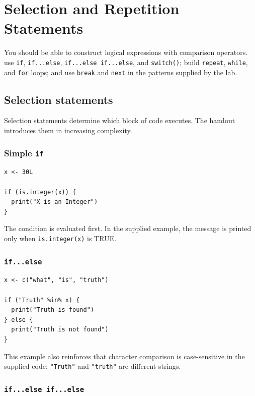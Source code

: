 \chapter{Selection and Repetition Statements}
\label{chap:control-flow}

\chapterguide
  {You should be able to construct logical expressions with comparison operators.}
  {use \texttt{if}, \texttt{if...else}, \texttt{if...else if...else}, and \texttt{switch()}; build \texttt{repeat}, \texttt{while}, and \texttt{for} loops; and use \texttt{break} and \texttt{next} in the patterns supplied by the lab.}

\section{Selection statements}

Selection statements determine which block of code executes. The handout introduces them in increasing complexity.

\subsection{Simple \texttt{if}}

\begin{lstlisting}[style=dsr]
x <- 30L

if (is.integer(x)) {
  print("X is an Integer")
}
\end{lstlisting}

The condition is evaluated first. In the supplied example, the message is printed only when \texttt{is.integer(x)} is TRUE.

\subsection{\texttt{if...else}}

\begin{lstlisting}[style=dsr]
x <- c("what", "is", "truth")

if ("Truth" %in% x) {
  print("Truth is found")
} else {
  print("Truth is not found")
}
\end{lstlisting}

This example also reinforces that character comparison is case-sensitive in the supplied code: \texttt{"Truth"} and \texttt{"truth"} are different strings.

\subsection{\texttt{if...else if...else}}

